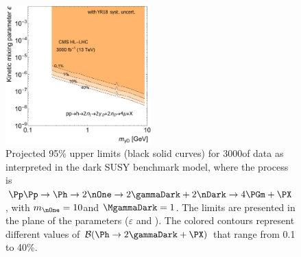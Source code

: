 \begin{figure}
\centering
\includegraphics[width=0.5\textwidth]{section9/cms_higgs2a4mu/plots/darksusy_plots_scenario_2/Limit_DarkPhoton_Epsilon_vs_mass_FTR_scenario2.pdf}%
\caption{Projected 95\% \CL upper limits (black solid curves) for 3000\Uifb of data as interpreted in the dark SUSY benchmark model, where the process is $\Pp\Pp \to \Ph \to 2\nOne \to 2\gammaDark+2\nDark \to  4\PGm+\PX$, with $m_{\nOne}=10$\UGeV and $\MgammaDark=1$\UGeV.
The limits are presented in the plane of the parameters ($\varepsilon$ and \MgammaDark). The colored contours represent different values of $\mathcal{B}(\Ph \to 2\gammaDark + \PX)$ that range from 0.1 to 40\%. }
\label{fig:my_label4}
\end{figure}


